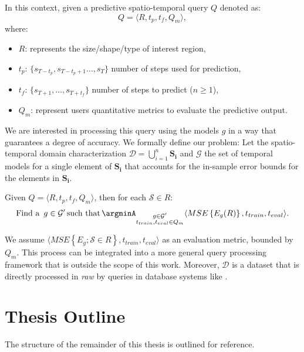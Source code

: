 In this context, given a predictive spatio-temporal query $Q$ denoted as:
\begin{equation} \label{eq:predictivequery}
Q = \langle R, t_{p}, t_{f}, Q_{m} \rangle,
\end{equation}
where:
\begin{itemize}[noitemsep,nolistsep]	
	\item $R$: represents the size/shape/type of interest region,
	\item $t_{p}$: $\{s_{T-t_p}, s_{T-t_{p}+1}\ldots, s_{T}\}$ number of steps used for prediction,
	\item $t_{f}$: $\{s_{T+1}, \ldots, s_{T+t_f}\}$ number of steps to predict ($n\geq 1$),
	\item $Q_{m}$: represent users quantitative metrics to evaluate the predictive output.
\end{itemize}
We are interested in processing this query using the models $g$ in a way that guarantees a degree of accuracy. We formally define our problem: Let the spatio-temporal domain characterization $\mathcal{D} = \bigcup_{i=1}^{n} \mathbf{S_i}$ and $\mathcal{G}$ the set of temporal models for a single element of $\mathbf{S_i}$ that accounts for the in-sample error bounds for the elements in $\mathbf{S_i}$. 

\newpage
Given $Q = \langle R, t_{p}, t_{f}, Q_{m} \rangle$, then for each $\mathcal{S} \in R$:
\begin{equation}
\textrm{Find a\, } g \in \mathcal{G'} \,\textrm{such that} \, \argminA_{\substack{g\in\mathcal{G'} \\t_{train}, t_{eval} \in Q_{m}}} \langle MSE \left\{E_{g}(R)\right\}, t_{train}, t_{eval}\rangle .
\end{equation}

We assume $\langle MSE\left\{E_{g}; \mathcal{S}\in R\right\}, t_{train}, t_{eval}\rangle$ as an evaluation metric, bounded by $Q_{m}$. This process can be integrated into a more general query processing framework that is outside the scope of this work. Moreover,  $\mathcal{D}$ is a dataset that is directly processed in \emph{raw} by queries in database systems like \cite{Karpathiotakis2014, Lustosa2020}. 


\section{Thesis Outline}
\label{Sec:ThesisOutline}

The structure of the remainder of this thesis is outlined for reference.


